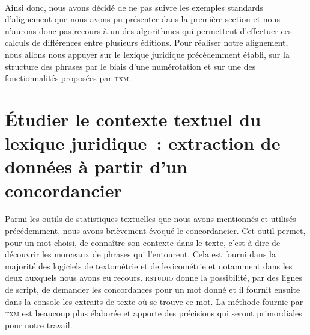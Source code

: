 \paragraph{} Ainsi donc, nous avons décidé de ne pas suivre les exemples standards d’alignement que nous avons pu présenter dans la première section et nous n’aurons donc pas recours à un des algorithmes qui permettent d’effectuer ces calculs de différences entre plusieurs éditions. Pour réaliser notre alignement, nous allons nous appuyer sur le lexique juridique précédemment établi, sur la structure des phrases par le biais d’une numérotation et sur une des fonctionnalités proposées par \textsc{txm}.

\section{Étudier le contexte textuel du lexique juridique~: extraction de données à partir d’un concordancier}
Parmi les outils de statistiques textuelles que nous avons mentionnés et utilisés précédemment, nous avons brièvement évoqué le concordancier. Cet outil permet, pour un mot choisi, de connaître son contexte dans le texte, c’est-à-dire de découvrir les morceaux de phrases qui l’entourent. Cela est fourni dans la majorité des logiciels de textométrie et de lexicométrie et notamment dans les deux auxquels nous avons eu recours. \textsc{rstudio} donne la possibilité, par des lignes de script, de demander les concordances pour un mot donné et il fournit ensuite dans la console les extraits de texte où se trouve ce mot. La méthode fournie par \textsc{txm} est beaucoup plus élaborée et apporte des précisions qui seront primordiales pour notre travail.

